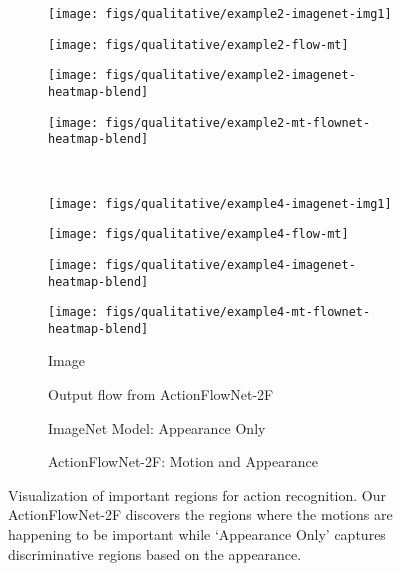 \documentclass[10pt,twocolumn,letterpaper]{article}
\begin{document}
\begin{figure*}[h!]
  \vspace{-1em}
\begin{center}
  \begin{subfigure}[ht]{0.18\linewidth}
      \texttt{[image: figs/qualitative/example2-imagenet-img1]}
  \end{subfigure}
  \begin{subfigure}[ht]{0.18\linewidth}
      \texttt{[image: figs/qualitative/example2-flow-mt]}
  \end{subfigure}
  \begin{subfigure}[ht]{0.18\linewidth}
      \texttt{[image: figs/qualitative/example2-imagenet-heatmap-blend]}
  \end{subfigure}
  \begin{subfigure}[ht]{0.18\linewidth}
      \texttt{[image: figs/qualitative/example2-mt-flownet-heatmap-blend]}
  \end{subfigure}
  \\
  \begin{subfigure}[ht]{0.18\linewidth}
      \texttt{[image: figs/qualitative/example4-imagenet-img1]}
  \end{subfigure}
  \begin{subfigure}[ht]{0.18\linewidth}
      \texttt{[image: figs/qualitative/example4-flow-mt]}
  \end{subfigure}
  \begin{subfigure}[ht]{0.18\linewidth}
      \texttt{[image: figs/qualitative/example4-imagenet-heatmap-blend]}
  \end{subfigure}
  \begin{subfigure}[ht]{0.18\linewidth}
      \texttt{[image: figs/qualitative/example4-mt-flownet-heatmap-blend]}
  \end{subfigure}

  \begin{subfigure}[ht]{0.18\linewidth}
      \caption{Image}
  \end{subfigure}
  \begin{subfigure}[ht]{0.18\linewidth}
      \caption{Output flow from ActionFlowNet-2F}
  \end{subfigure}
  \begin{subfigure}[ht]{0.18\linewidth}
      \caption{ImageNet Model: Appearance Only}
  \end{subfigure}
  \begin{subfigure}[ht]{0.18\linewidth}
      \caption{ActionFlowNet-2F: Motion and Appearance}
  \end{subfigure}
  \vspace{-1em}
  \caption{Visualization of important regions for action recognition. Our ActionFlowNet-2F discovers the regions where the motions are happening to be important while `Appearance Only' captures discriminative regions based on the appearance.}
  \label{fig:qual}
  \vspace{-2em}
\end{center}
\end{figure*}
\end{document}
